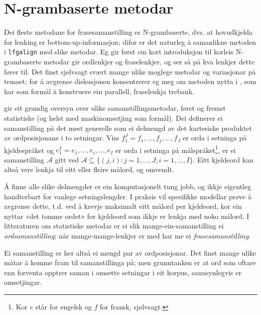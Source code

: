 \documentclass[12pt,a4paper,oneside,draft]{report}
\begin{document}
\section{N-grambaserte metodar}
\label{sec-5.2}


Dei fleste metodane for frasesamanstilling er N-grambaserte, dvs. at
 hovudkjelda for lenking er bottom-up-informasjon; difor er det
 naturleg å samanlikne metoden i \texttt{lfgalign} med slike metodar. Eg gir
 først ein kort introduksjon til korleis N-grambaserte metodar gir
 ordlenkjer og fraselenkjer, og ser så på kva lenkjer dette fører
 til. Det finst sjølvsagt svært mange ulike moglege metodar og
 variasjonar på temaet; for å avgrense diskusjonen konsentrerer eg meg
 om metoden nytta i \citet{samuelsson2007apa}, som har som formål å
 konstruere ein parallell, fraselenkja trebank.

\citet[s.~20--21]{och2003scv} gir eit grundig oversyn over ulike
 samanstillingsmetodar, først og fremst statistiske (og helst med
 maskinomsetjing som formål). Dei definerer ei samanstilling på det
 mest generelle som ei delmengd av det kartesiske produktet av
 ordposisjonane i to setningar. Viss $f_{1}^{J}=f_1,...,f_j,...,f_J$
 er orda i setninga på kjeldespråket og
 $e_{1}^{I}=e_1,...,e_i,...,e_I$ er orda i setninga på
 målspråket\footnote{Kor $e$ står for engelsk og $f$ for fransk, sjølvsagt. }, er ei samanstilling $\mathcal{A}$ gitt ved
 $\mathcal{A}\subseteq \{(j,i): j=1,...,J;i=1,...,I\}$. Eitt kjeldeord
 kan altså vere lenkja til eitt eller fleire målord, og omvendt.

Å finne alle slike delmengder er ein komputasjonelt tung jobb, og
 ikkje eigentleg handterbart for vanlege setningslengder.  I praksis
 vil spesifikke modellar prøve å avgrense dette, t.d. ved å krevje
 maksimalt eitt målord per kjeldeord, kor ein nyttar «det tomme ordet»
 for kjeldeord som ikkje er lenkja med noko målord. I litteraturen om
 statistiske metodar er ei slik mange-ein-samanstilling ei
 \emph{ordsamanstilling}; når mange-mange-lenkjer er med har me ei
 \emph{frasesamanstilling}.

Ei samanstilling er her altså ei mengd par av ordposisjonar. Det
 finst mange ulike måtar å komme fram til samanstillinga på; men
 grunntanken er at ord som oftare enn forventa opptrer saman i omsette
 setningar i eit korpus, sannsynlegvis er omsetjingar.
\end{document}
